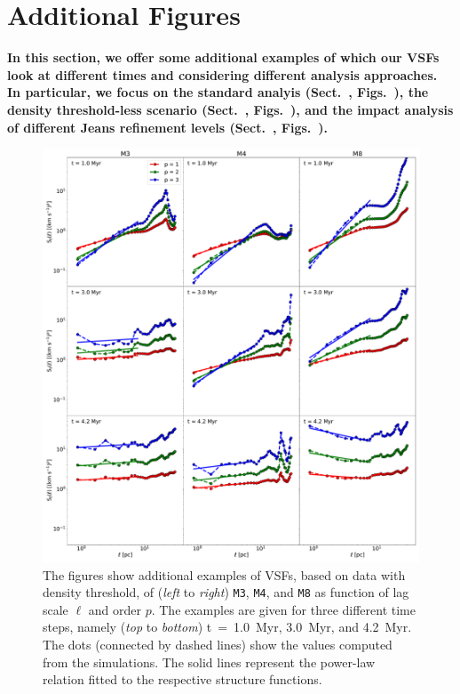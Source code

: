 \section{Additional Figures}\label{appFigures}

\textbf{
    In this section, we offer some additional examples of which our VSFs look at different times and considering different analysis approaches.
    In particular, we focus on the standard analyis (Sect.~, Figs.~), the density threshold-less scenario (Sect.~, Figs.~), and the impact analysis of different Jeans refinement levels (Sect.~, Figs.~).
}

 	
\begin{figure}
    \centering
    \includegraphics[width=\textwidth]{app_examples_wthres_s_l.pdf}
    \caption{
        The figures show additional examples of VSFs, based on data with density threshold, of (\textit{left} to \textit{right}) \texttt{M3}, \texttt{M4}, and \texttt{M8} as function of lag scale $\ell$ and order $p$. 
        The examples are given for three different time steps, namely (\textit{top} to \textit{bottom}) t~=~1.0~Myr, 3.0~Myr, and 4.2~Myr.
        The dots (connected by dashed lines) show the values computed from the simulations. 
        The solid lines represent the power-law relation fitted to the respective structure functions.
    }
    \label{pic:appFigures:examples_with_threshold_s_vs_l}
\end{figure}
 	
